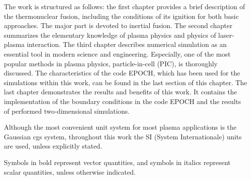 The work is structured as follows: the first chapter provides a brief description of the thermonuclear fusion, including the conditions of its ignition for both basic approaches. The major part is devoted to inertial fusion. The second chapter summarizes the elementary knowledge of plasma physics and physics of laser-plasma interaction. The third chapter describes numerical simulation as an essential tool in modern science and engineering. Especially, one of the most popular methods in plasma physics, particle-in-cell (PIC), is thoroughly discussed. The characteristics of the code EPOCH\cite{bennett}, which has been used for the simulations within this work, can be found in the last section of this chapter. The last chapter demonstrates the results and benefits of this work. It contains the implementation of the boundary conditions in the code EPOCH and the results of performed two-dimensional simulations.

Although the most convenient unit system for most plasma applications is the Gaussian cgs system, throughout this work the SI (System Internationale) units are used, unless explicitly stated.

Symbols in bold represent vector quantities, and symbols in italics represent scalar quantities, unless otherwise indicated.
